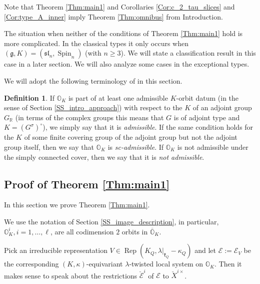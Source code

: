 \documentclass[12pt]{amsart}
\newcommand{\C}{\mathbb{C}}
\newcommand{\A}{\mathcal{A}}
\newcommand{\g}{\mathfrak{g}}
\newcommand{\Orb}{\mathbb{O}}
\newcommand{\kf}{\mathfrak{k}}
\newcommand{\R}{\mathbb{R}}
\newcommand{\GR}{G_\R}
\theoremstyle{definition}
\newtheorem{defi}[Thm]{Definition}
\numberwithin{equation}{section}
\begin{document}
Note that Theorem \ref{Thm:main1} and Corollaries \ref{Cor:c_2_tau_slices} and
\ref{Cor:type_A_inner} imply Theorem \ref{Thm:omnibus} from Introduction.

The situation when neither of the conditions of Theorem \ref{Thm:main1} hold
is more complicated. In the classical types it only occurs when
$(\g,K)=(\mathfrak{sl}_n, \operatorname{Spin}_n)$ (with $n\geqslant 3$).
We will state a classification result in this case in a later section.
We will also analyze some cases in the exceptional types.

We will adopt the following terminology of \cite{Noel1, Noel2} in this section. 

\begin{defi}\label{defn:sc-admissible}
	If $\Orb_K$ is part of at least one admissible $K$-orbit datum (in the sense of Section \ref{SS_intro_approach}) with respect to the $K$ of an adjoint group $\GR$ (in terms of the complex groups this means that $G$ is of adjoint type and $K=(G^\sigma)^\circ$), we simply say that it is \emph{admissible}. If the same condition holds for the $K$ of some finite covering group of the adjoint group but not the adjoint group itself, then we say that $\Orb_K$ is \emph{sc-admissible}. If $\Orb_K$ is not admissible under the simply connected cover, then we say that it is \emph{not admissible}.
\end{defi}


\subsection{Proof of Theorem \ref{Thm:main1}}
In this section we prove Theorem \ref{Thm:main1}.

We use the notation of Section \ref{SS_image_description}, in particular,
$\Orb_K^i, i=1,\ldots,\ell$, are all codimension $2$ orbits in $\overline{\Orb}_K$.

Pick an irreducible representation $V\in \operatorname{Rep}(K_Q,\lambda|_{\kf_Q}-\kappa_Q)$ and let
$\mathcal{E}:=\mathcal{E}_V$ be the corresponding $(K,\kappa)$-equivariant $\lambda$-twisted local system
on $\Orb_K$. Then it makes sense to speak about the restrictions $\check{\mathcal{E}}^i$
of $\mathcal{E}$ to $\check{X}^{i\times}$.
\end{document}
